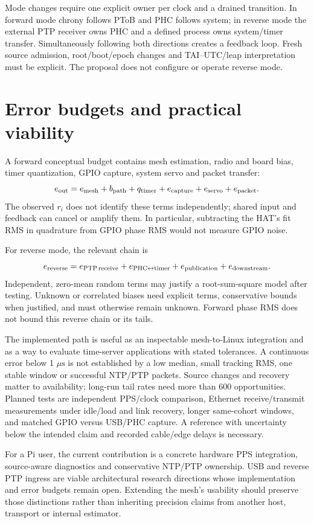 \documentclass[10pt,letterpaper]{article}
\newcommand{\us}{\ensuremath{\mu\mathrm{s}}}
\begin{document}
Mode changes require one explicit owner per clock and a drained transition.
In forward mode chrony follows PToB and PHC follows system; in reverse mode
the external PTP receiver owns PHC and a defined process owns system/timer
transfer. Simultaneously following both directions creates a feedback loop.
Fresh source admission, root/boot/epoch changes and TAI--UTC/leap interpretation
must be explicit. The proposal does not configure or operate reverse mode.

\section{Error budgets and practical viability}
A forward conceptual budget contains mesh estimation, radio and board bias,
timer quantization, GPIO capture, system servo and packet transfer:
\[
 e_{\rm out}=e_{\rm mesh}+b_{\rm path}+q_{\rm timer}
              +e_{\rm capture}+e_{\rm servo}+e_{\rm packet}.
\]
The observed \(r_i\) does not identify these terms independently; shared input
and feedback can cancel or amplify them. In particular, subtracting the HAT's
fit RMS in quadrature from GPIO phase RMS would not measure GPIO noise.

For reverse mode, the relevant chain is
\[
 e_{\rm reverse}=e_{\rm PTP\,receive}+e_{\rm PHC\leftrightarrow timer}
                 +e_{\rm publication}+e_{\rm downstream}.
\]
Independent, zero-mean random terms may justify a root-sum-square model after
testing. Unknown or correlated biases need explicit terms, conservative bounds
when justified, and must otherwise remain unknown. Forward phase RMS does not
bound this reverse chain or its tails.

The implemented path is useful as an inspectable mesh-to-Linux integration and
as a way to evaluate time-server applications with stated tolerances.
A continuous error below 1 \us{} is not established by a low median, small
tracking RMS, one stable window or successful NTP/PTP packets. Source changes
and recovery matter to availability; long-run tail rates need more than 600
opportunities. Planned tests are independent PPS/clock comparison, Ethernet
receive/transmit measurements under idle/load and link recovery, longer
same-cohort windows, and matched GPIO versus USB/PHC capture. A reference with
uncertainty below the intended claim and recorded cable/edge delays is necessary.

For a Pi user, the current contribution is a concrete hardware PPS integration,
source-aware diagnostics and conservative NTP/PTP ownership. USB and reverse
PTP ingress are viable architectural research directions whose implementation
and error budgets remain open. Extending the mesh's usability should preserve
those distinctions rather than inheriting precision claims from another host,
transport or internal estimator.
\end{document}
